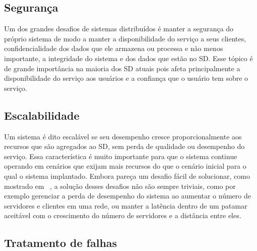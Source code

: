     \subsection{Segurança}
        Um dos grandes desafios de sistemas distribuídos é manter a segurança do próprio sistema de modo a manter a disponibilidade do serviço a seus clientes, confidencialidade dos dados que ele armazena ou processa e não menos importante, a integridade do sistema e dos dados que estão no SD. Esse tópico é de grande importância na maioria dos SD atuais pois afeta principalmente a disponibilidade do serviço aos usuários e a confiança que o usuário tem sobre o serviço.
    
    \subsection{Escalabilidade}
        Um sistema é dito escalável se seu desempenho cresce proporcionalmente aos recursos que são agregados ao SD, sem perda de qualidade ou desempenho do serviço. Essa característica é muito importante para que o sistema continue operando em cenários que exijam mais recursos do que o cenário inicial para o qual o sistema implantado. Embora pareça um desafio fácil de solucionar, como mostrado em ~\cite{coulouris}, a solução desses desafios não são sempre triviais, como por exemplo gerenciar a perda de desempenho do sistema ao aumentar o número de servidores e clientes em uma rede, ou manter a latência dentro de um patamar aceitável com o crescimento do número de servidores e a distância entre eles.
    
    \subsection{Tratamento de falhas}

